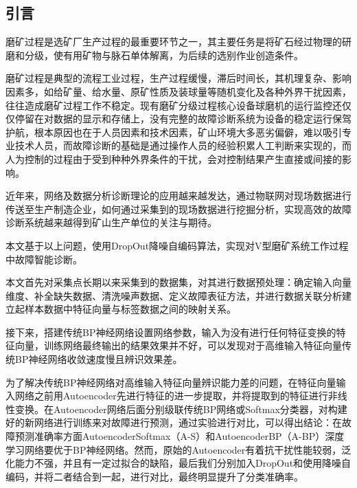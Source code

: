 \documentclass{ctacn}%
\begin{document}


\maketitle




\begin{multicols}{2}
\section{引\quad 言}
磨矿过程是选矿厂生产过程的最重要环节之一，其主要任务是将矿石经过物理的研磨和分级，使有用矿物与脉石单体解离，为后续的选别作业创造条件。

磨矿过程是典型的流程工业过程，生产过程缓慢，滞后时间长，其机理复杂、影响因素多，如给矿量、给水量、原矿性质及装球量等随机变化及各种外界干扰因素，往往造成磨矿过程工作不稳定。现有磨矿分级过程核心设备球磨机的运行监控还仅仅停留在对数据的显示和存储上，没有完整的故障诊断系统为设备的稳定运行保驾护航，根本原因也在于人员因素和技术因素，矿山环境大多恶劣偏僻，难以吸引专业技术人员，而故障诊断的基础是通过操作人员的经验积累人工判断来实现的，而人为控制的过程由于受到种种外界条件的干扰，会对控制结果产生直接或间接的影响。

近年来，网络及数据分析诊断理论的应用越来越发达，通过物联网对现场数据进行传送至生产制造企业，如何通过采集到的现场数据进行挖掘分析，实现高效的故障诊断系统越来越得到矿山生产单位的关注与期待。

本文基于以上问题，使用DropOut降噪自编码算法，实现对V型磨矿系统工作过程中故障智能诊断。

本文首先对采集点长期以来采集到的数据集，对其进行数据预处理：确定输入向量维度、补全缺失数据、清洗噪声数据、定义故障表征方法，并进行数据关联分析建立起样本数据中特征向量与标签数据之间的映射关系。

接下来，搭建传统BP神经网络设置网络参数，输入为没有进行任何特征变换的特征向量，训练网络最终输出的结果效果并不好，可以发现对于高维输入特征向量传统BP神经网络收敛速度慢且辨识效果差。

为了解决传统BP神经网络对高维输入特征向量辨识能力差的问题，在特征向量输入网络之前用Autoencoder先进行特征的进一步提取，并将提取到的特征进行非线性变换。在Autoencoder网络后面分别级联传统BP网络或Softmax分类器，对构建好的新网络进行训练来对故障进行预测，通过实验进行对比，可以得出结论：在故障预测准确率方面AutoencoderSoftmax（A-S）和AutoencoderBP（A-BP）深度学习网络要优于BP神经网络。然而，原始的Autoencoder有着抗干扰性能较弱，泛化能力不强，并且有一定过拟合的缺陷，最后我们分别加入DropOut和使用降噪自编码，并将二者结合到一起，进行对比，最终明显提升了分类准确率。


\end{multicols}
\end{document}
